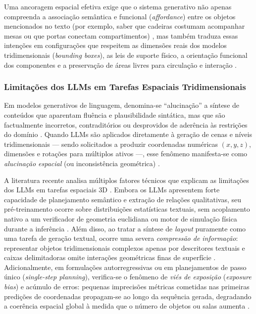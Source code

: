Uma ancoragem espacial efetiva exige que o sistema generativo não apenas compreenda a associação semântica e funcional (\textit{affordance}) entre os objetos mencionados no texto (por exemplo, saber que cadeiras costumam acompanhar mesas ou que portas conectam compartimentos) \cite{Gallotta_2024, chen2025narrative}, mas também traduza essas intenções em configurações que respeitem as dimensões reais dos modelos tridimensionais (\textit{bounding boxes}), as leis de suporte físico, a orientação funcional dos componentes e a preservação de áreas livres para circulação e interação \cite{sun2024roomplanner, xu2025constraint, ocal2024sceneteller}.

\subsubsection{Limitações dos LLMs em Tarefas Espaciais Tridimensionais}
\label{sec:limitacoes_espaciais_llms}

Em modelos generativos de linguagem, denomina-se ``alucinação'' a síntese de conteúdos que aparentam fluência e plausibilidade sintática, mas que são factualmente incorretos, contraditórios ou desprovidos de aderência às restrições do domínio \cite{Gallotta_2024, xu2025constraint, bandeali2026generative}. Quando LLMs são aplicados diretamente à geração de cenas e níveis tridimensionais --- sendo solicitados a produzir coordenadas numéricas $(x, y, z)$, dimensões e rotações para múltiplos ativos ---, esse fenômeno manifesta-se como \textit{alucinação espacial} (ou inconsistência geométrica) \cite{Gallotta_2024, sun2024roomplanner, yang2026codeasroomgenerating3drooms, feng2026repurposing3dgenerativemodel}.

A literatura recente analisa múltiplos fatores técnicos que explicam as limitações dos LLMs em tarefas espaciais 3D \cite{Gallotta_2024, hu2024scenecraft, sun2024roomplanner, feng2026repurposing3dgenerativemodel, yang2026codeasroomgenerating3drooms}. Embora os LLMs apresentem forte capacidade de planejamento semântico e extração de relações qualitativas, seu pré-treinamento ocorre sobre distribuições estatísticas textuais, sem acoplamento nativo a um verificador de geometria euclidiana ou motor de simulação física durante a inferência \cite{Gallotta_2024, sun2024roomplanner, feng2026repurposing3dgenerativemodel}. Além disso, ao tratar a síntese de \textit{layout} puramente como uma tarefa de geração textual, ocorre uma severa \textit{compressão de informação}: representar objetos tridimensionais complexos apenas por descritores textuais e caixas delimitadoras omite interações geométricas finas de superfície \cite{feng2026repurposing3dgenerativemodel}. Adicionalmente, em formulações autorregressivas ou em planejamentos de passo único (\textit{single-step planning}), verifica-se o fenômeno de \textit{viés de exposição} (\textit{exposure bias}) e acúmulo de erros: pequenas imprecisões métricas cometidas nas primeiras predições de coordenadas propagam-se ao longo da sequência gerada, degradando a coerência espacial global à medida que o número de objetos ou salas aumenta \cite{ocal2024sceneteller, sun2024roomplanner, feng2026repurposing3dgenerativemodel, yang2026codeasroomgenerating3drooms}.

